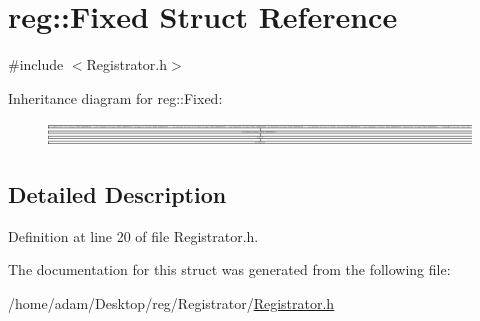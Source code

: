 \hypertarget{structreg_1_1_fixed}{}\section{reg\+:\+:Fixed Struct Reference}
\label{structreg_1_1_fixed}


{\ttfamily \#include $<$Registrator.\+h$>$}

Inheritance diagram for reg\+:\+:Fixed\+:\begin{figure}[H]
\begin{center}
\leavevmode
\includegraphics[height=0.625698cm]{structreg_1_1_fixed}
\end{center}
\end{figure}


\subsection{Detailed Description}


Definition at line 20 of file Registrator.\+h.



The documentation for this struct was generated from the following file\+:\begin{DoxyCompactItemize}
\item 
/home/adam/\+Desktop/reg/\+Registrator/\hyperlink{_registrator_8h}{Registrator.\+h}\end{DoxyCompactItemize}
